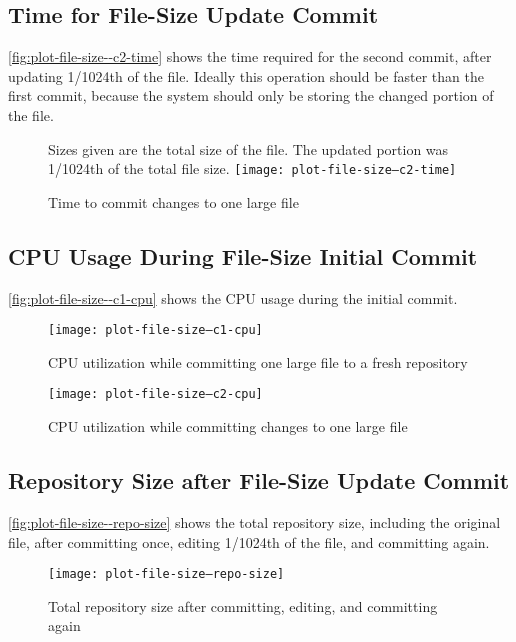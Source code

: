 \subsection{Time for File-Size Update Commit}

\autoref{fig:plot-file-size--c2-time} shows the time required for the second
commit, after updating \num{1/1024}th of the file. Ideally this operation should
be faster than the first commit, because the system should only be storing the
changed portion of the file.


\begin{figure}[]
    \caption{Time to commit changes to one large file}
    \label{fig:plot-file-size--c2-time}
    \centering
    Sizes given are the total size of the file. The updated portion was
    \num{1/1024}th of the total file size.
    \texttt{[image: plot-file-size--c2-time]}
\end{figure}


\subsection{CPU Usage During File-Size Initial Commit}

\autoref{fig:plot-file-size--c1-cpu} shows the
CPU usage during the initial commit.

\begin{figure}[]
  \caption{CPU utilization while committing one large file to a fresh repository}
  \label{fig:plot-file-size--c1-cpu}
  \centering
    \texttt{[image: plot-file-size--c1-cpu]}
\end{figure}


\begin{figure}[]
  \caption{CPU utilization while committing changes to one large file}
  \label{fig:plot-file-size--c2-cpu}
  \centering
    \texttt{[image: plot-file-size--c2-cpu]}
\end{figure}


\subsection{Repository Size after File-Size Update Commit}

\autoref{fig:plot-file-size--repo-size} shows the total
repository size, including the original file, after committing once, editing
1/1024th of the file, and committing again.


\begin{figure}[]
  \caption{Total repository size after committing, editing, and committing again}
  \label{fig:plot-file-size--repo-size}
  \centering
    \texttt{[image: plot-file-size--repo-size]}
\end{figure}

